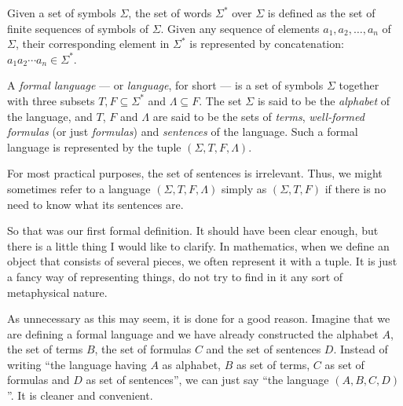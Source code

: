 \begin{definition}
Given a set of symbols $\Sigma$, the set of words $\Sigma^*$ over $\Sigma$ is defined as the set of finite sequences of symbols of $\Sigma$.
Given any sequence of elements $a_1,a_2,\ldots,a_n$ of $\Sigma$, their corresponding element in $\Sigma^*$ is represented by concatenation: $a_1a_2\cdots a_n\in \Sigma^*$.

A \emph{formal language} --- or \emph{language}, for short --- is a set of symbols $\Sigma$ together with three subsets $T,F\subseteq \Sigma^*$ and $\Lambda \subseteq F$.
The set $\Sigma$ is said to be the \emph{alphabet} of the language, and $T$, $F$ and $\Lambda$ are said to be the sets of \emph{terms}, \emph{well-formed formulas} (or just \emph{formulas}) and \emph{sentences} of the language.
Such a formal language is represented by the tuple $(\Sigma, T, F, \Lambda)$.


For most practical purposes, the set of sentences is irrelevant.
Thus, we might sometimes refer to a language $(\Sigma, T, F, \Lambda)$ simply as $(\Sigma, T, F)$ if there is no need to know what its sentences are. 
\end{definition}

\begin{para}
So that was our first formal definition.
It should have been clear enough, but there is a little thing I would like to clarify.
In mathematics, when we define an object that consists of several pieces, we often represent it with a tuple.
It is just a fancy way of representing things, do not try to find in it any sort of metaphysical nature.

As unnecessary as this may seem, it is done for a good reason.
Imagine that we are defining a formal language and we have already constructed the alphabet $A$, the set of terms $B$, the set of formulas $C$ and the set of sentences $D$.
Instead of writing ``the language having $A$ as alphabet, $B$ as set of terms, $C$ as set of formulas and $D$ as set of sentences'', we can just say ``the language $(A,B,C,D)$''.
It is cleaner and convenient.
\end{para}

